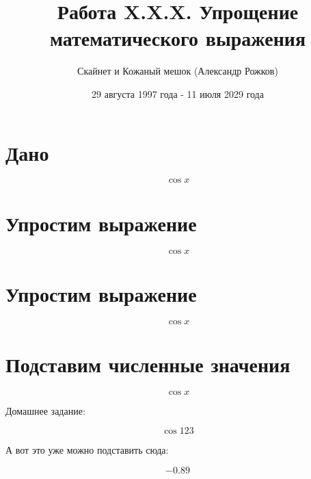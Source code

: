 \documentclass[12pt]{article}
\title{Работа X.X.X. Упрощение математического выражения}
\author{Скайнет и Кожаный мешок (Александр Рожков)}
\date{29 августа 1997 года - 11 июля 2029 года}
\begin{document}
\maketitle
\newpage

\section{Дано}

$$ \cos{x  }  $$

\section{Упростим выражение}

$$ \cos{x  }  $$

\section{Упростим выражение}

$$ \cos{x  }  $$

\section{Подставим численные значения}

$$ \cos{x  }  $$

Домашнее задание:

$$ \cos{123  }  $$

А вот это уже можно подставить сюда:

$$ -0.89  $$
\end{document}
